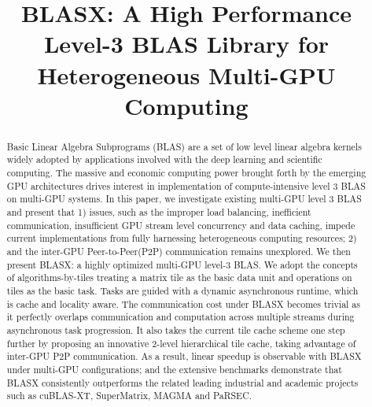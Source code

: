 \documentclass[conference]{IEEEtran}
\begin{document}
\title{ BLASX: A High Performance Level-3 BLAS Library for Heterogeneous Multi-GPU Computing \vspace{-0.35in}}
\author{
}
\maketitle
\begin{abstract}
Basic Linear Algebra Subprograms (BLAS) are a set of low level linear algebra kernels widely 
adopted by applications involved with the deep learning and scientific computing.
The massive and economic computing power brought forth by the emerging GPU architectures drives
interest in implementation of compute-intensive level 3 BLAS on multi-GPU systems.
In this paper, we investigate existing multi-GPU level 3 BLAS and present that 
1) issues, such as the improper load balancing, inefficient communication, insufficient GPU 
stream level concurrency and data caching, impede current 
implementations from fully harnessing heterogeneous computing resources;
2) and the inter-GPU Peer-to-Peer(P2P) communication remains unexplored.
We then present BLASX: a highly optimized multi-GPU level-3 BLAS. 
We adopt the concepts of algorithms-by-tiles treating a matrix tile as the basic data unit 
and operations on tiles as the basic task. Tasks are guided with a dynamic asynchronous 
runtime, which is cache and locality aware. The communication cost under BLASX becomes 
trivial as it perfectly overlaps communication and computation across multiple streams 
during asynchronous task progression. It also takes the current tile 
cache scheme one step further by proposing an innovative 2-level hierarchical tile cache, 
taking advantage of inter-GPU P2P communication. As a result, linear speedup is observable with 
BLASX under multi-GPU configurations; and the extensive benchmarks demonstrate that BLASX consistently 
outperforms the related leading industrial and academic projects such as cuBLAS-XT, SuperMatrix, 
MAGMA and PaRSEC.
\end{abstract}
\end{document}
